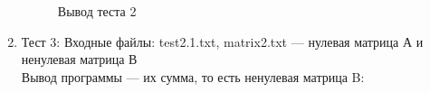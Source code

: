 \documentclass[12pt, a4paper]{article}
\begin{document}
\begin{enumerate}
\begin{figure}[h]
  		\caption{Вывод теста 2}
	\end{figure}
	\newpage
	\item Тест 3: Входные файлы: test2.1.txt, 
	matrix2.txt --- нулевая матрица А и ненулевая матрица 
	В\\
	Вывод программы --- их сумма, то есть ненулевая матрица B:
	\begin{figure}[h]

\end{figure}
\end{enumerate}
\end{document}
